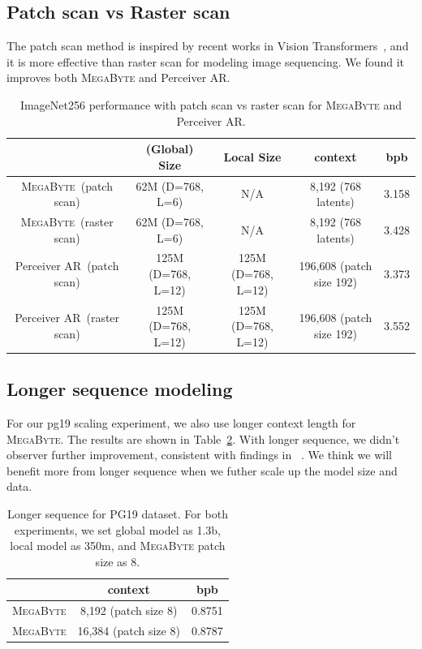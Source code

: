 \documentclass{article}
\newcommand{\fastslow}[0]{\textsc{MegaByte}\xspace}
\newcommand{\megabyte}[0]{\fastslow}
\theoremstyle{plain}
\theoremstyle{definition}
\theoremstyle{remark}
\begin{document}
\subsection{Patch scan vs Raster scan}

The patch scan method is inspired by recent works in Vision Transformers~\citep{vit}, and it is more effective than raster scan for modeling image sequencing. We found it improves both \megabyte and Perceiver AR. 
\begin{table}[h]
    \centering\small
    \begin{tabular}{ccccc}
    \toprule
 & (Global) Size & Local Size  & context  & bpb \\
    \midrule
\megabyte~(patch scan) & 62M (D=768, L=6) & N/A  & 8,192 (768 latents)  & 3.158                   \\
\megabyte~(raster scan) & 62M (D=768, L=6) & N/A  & 8,192 (768 latents)  & 3.428                   \\
Perceiver AR~(patch scan)  & 125M (D=768, L=12) & 125M (D=768, L=12) & 196,608 (patch size 192) & 3.373                   \\
Perceiver AR~(raster scan)  & 125M (D=768, L=12) & 125M (D=768, L=12) & 196,608 (patch size 192) & 3.552                  \\
    \bottomrule
    \end{tabular}
    \caption{ImageNet256 performance with patch scan vs raster scan for \megabyte and Perceiver AR.}
    \label{tab:patch_vs_raster}
\end{table}

\subsection{Longer sequence modeling}
\label{sec:long_text}
For our pg19 scaling experiment, we also use longer context length for \megabyte. The results are shown in Table~\ref{tab:longer_seq}. With longer sequence, we didn't observer further improvement, consistent with findings in ~\citet{perceiverar}. We think we will benefit more from longer sequence when we futher scale up the model size and data. 

\begin{table}[h]
    \centering
    \begin{tabular}{ccc}
    \toprule
 & context  & bpb \\
    \midrule
\megabyte &  8,192 (patch size 8)  & 0.8751                 \\
\megabyte &  16,384 (patch size 8)  & 0.8787                  \\
    \bottomrule
    \end{tabular}
    \caption{Longer sequence for PG19 dataset. For both experiments, we set global model as 1.3b, local model as 350m, and \megabyte patch size as 8.}
    \label{tab:longer_seq}
\end{table}
\end{document}
